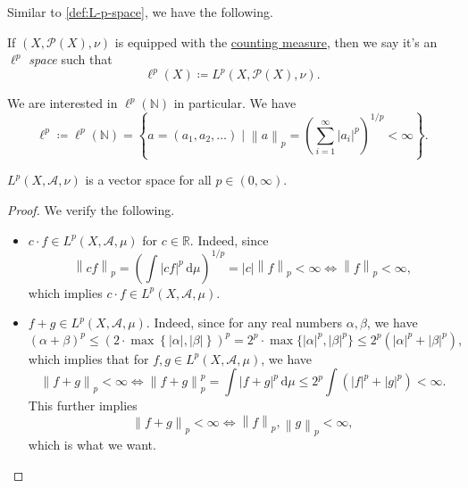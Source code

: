 Similar to \autoref{def:L-p-space}, we have the following.
\begin{definition}\label{def:l-p-space}
	If \((X, \mathcal{P} (X), \nu )\) is equipped with the \hyperref[eg:counting-measure]{counting measure}, then we say it's an \emph{\(\ell ^p\) space} such that
	\[
		\ell ^p(X) \coloneqq L^p(X, \mathcal{P} (X), \nu ).
	\]
\end{definition}
\begin{remark}
	We are interested in \(\ell ^p(\mathbb{N} )\) in particular. We have
	\[
		\ell ^p\coloneqq \ell ^p(\mathbb{N} ) = \left\{a = (a_1, a_2, \dots  )\mid \left\lVert a\right\rVert _p = \left(\sum\limits_{i=1}^{\infty} \left\vert a_{i} \right\vert^p \right)^{1/p}< \infty \right\}.
	\]
\end{remark}

\begin{lemma}
	\(L^p(X, \mathcal{A} , \nu )\) is a vector space for all \(p\in (0, \infty )\).
\end{lemma}
\begin{proof}
	We verify the following.
	\begin{itemize}
		\item \(c\cdot f \in L^p(X, \mathcal{A} , \mu )\) for \(c\in \mathbb{R} \). Indeed, since
		      \[
			      \left\lVert cf\right\rVert _p = \left(\int \left\vert cf \right\vert ^p\,\mathrm{d} \mu \right)^{1/p} = \left\vert c \right\vert \left\lVert f\right\rVert _p < \infty \iff \left\lVert f\right\rVert _p <\infty,
		      \]
		      which implies \(c\cdot f\in L^p(X, \mathcal{A} , \mu )\).
		\item \(f + g\in L^p(X, \mathcal{A} , \mu )\). Indeed, since for any real numbers \(\alpha , \beta \), we have
		      \[
			      (\alpha +\beta )^p \leq (2\cdot \mathop{\max} \left\{\left\vert \alpha  \right\vert, \left\vert \beta  \right\vert  \right\})^p = 2^p \cdot \mathop{\max} \{\left\vert \alpha  \right\vert^p, \left\vert \beta  \right\vert ^p \}\leq 2^p \left(\left\vert \alpha  \right\vert^p + \left\vert \beta  \right\vert^p  \right),
		      \]
		      which implies that for \(f, g\in L^p (X, \mathcal{A} , \mu )\), we have
		      \[
			      \left\lVert f+g\right\rVert _p < \infty \iff \left\lVert f + g\right\rVert _p^p = \int \left\vert f + g \right\vert ^p \,\mathrm{d} \mu  \leq 2^p \int (\left\vert f \right\vert ^p + \left\vert g \right\vert ^p)< \infty.
		      \]
		      This further implies
		      \[
			      \left\lVert f + g\right\rVert _p < \infty  \iff \left\lVert f\right\rVert _p, \left\lVert g\right\rVert _p < \infty ,
		      \]
		      which is what we want.
	\end{itemize}
\end{proof}


